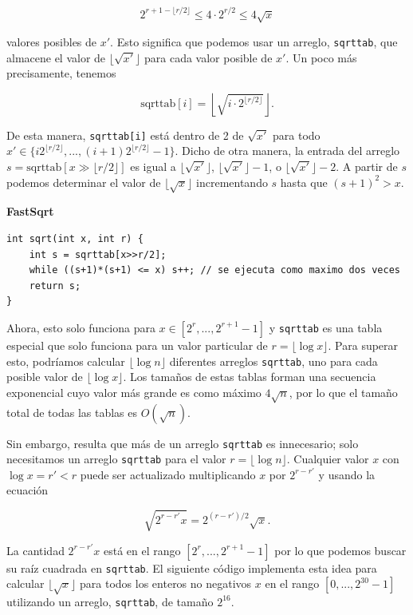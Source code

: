 \documentclass[11pt]{book}
\theoremstyle{plain}
\newcommand{\claseheader}[1]{\noindent\textbf{#1}\par\vspace{-4pt}}
\begin{document}
$$
2^{r+1-\lfloor r/2\rfloor} \le 4 \cdot 2^{r/2} \le 4\sqrt{x}
$$

valores posibles de $x'$. Esto significa que podemos usar un arreglo, \texttt{sqrttab}, que almacene el valor de $\lfloor\sqrt{x'}\rfloor$ para cada valor posible de $x'$. Un poco más precisamente, tenemos

$$
\text{sqrttab}[i] = \left\lfloor\sqrt{i \cdot 2^{\lfloor r/2\rfloor}}\right\rfloor .
$$

De esta manera, \texttt{sqrttab[i]} está dentro de 2 de $\sqrt{x'}$ para todo $x' \in \{i2^{\lfloor r/2\rfloor}, ..., (i+1)2^{\lfloor r/2\rfloor}-1\}$. Dicho de otra manera, la entrada del arreglo $s = \text{sqrttab}[x \gg \lfloor r/2\rfloor]$ es igual a $\lfloor\sqrt{x'}\rfloor$, $\lfloor\sqrt{x'}\rfloor - 1$, o $\lfloor\sqrt{x'}\rfloor - 2$. A partir de $s$ podemos determinar el valor de $\lfloor\sqrt{x}\rfloor$ incrementando $s$ hasta que $(s+1)^2 > x$.

\claseheader{FastSqrt}
\begin{lstlisting}
int sqrt(int x, int r) {
    int s = sqrttab[x>>r/2];
    while ((s+1)*(s+1) <= x) s++; // se ejecuta como maximo dos veces
    return s;
}
\end{lstlisting}

Ahora, esto solo funciona para $x \in [2^r,..., 2^{r+1}-1]$ y \texttt{sqrttab} es una tabla especial que solo funciona para un valor particular de $r = \lfloor\log x\rfloor$. Para superar esto, podríamos calcular $\lfloor\log n\rfloor$ diferentes arreglos \texttt{sqrttab}, uno para cada posible valor de $\lfloor\log x\rfloor$. Los tamaños de estas tablas forman una secuencia exponencial cuyo valor más grande es como máximo $4\sqrt{n}$, por lo que el tamaño total de todas las tablas es $O(\sqrt{n})$.

Sin embargo, resulta que más de un arreglo \texttt{sqrttab} es innecesario; solo necesitamos un arreglo \texttt{sqrttab} para el valor $r = \lfloor\log n\rfloor$. Cualquier valor $x$ con $\log x = r' < r$ puede ser actualizado multiplicando $x$ por $2^{r-r'}$ y usando la ecuación

$$
\sqrt{2^{r-r'}x} = 2^{(r-r')/2}\sqrt{x} .
$$

La cantidad $2^{r-r'}x$ está en el rango $[2^r,..., 2^{r+1}-1]$ por lo que podemos buscar su raíz cuadrada en \texttt{sqrttab}. El siguiente código implementa esta idea para calcular $\lfloor\sqrt{x}\rfloor$ para todos los enteros no negativos $x$ en el rango $[0,...,2^{30}-1]$ utilizando un arreglo, \texttt{sqrttab}, de tamaño $2^{16}$.
\end{document}
